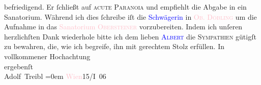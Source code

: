                     befriedigend. Er ſchließt auf \textsc{acute Paranoia} und
                    empfiehlt die Abgabe in ein Sanatorium.\pend
           \pstart
           Während ich dies ſchreibe iſt die \textcolor{blue}{Schwägerin}{} in \textcolor{pink}{\textsc{Ob. Döbling}}{}\ledrightnote{\textcolor{pink}{Oberdöbling}} um die Aufnahme in das \textcolor{pink}{Sanatorium \textsc{Obersteiner}}{}\ledrightnote{\textcolor{pink}{Sanatorium Obersteiner}} vorzubereiten.\pend
           \pstart
           Indem ich unſeren herzlichſten Dank wiederhole {\pb}bitte ich dem lieben \textcolor{blue}{\textsc{Albert}}{}\ledrightnote{\textcolor{blue}{Albert Ehrenstein}} die \textsc{Sympathien} gütigſt zu bewahren, die, wie ich
                    begreife, ihn mit gerechtem Stolz erfüllen.\pend
           \pstart
           In vollkommener Hochachtung{\\[\baselineskip]}ergebenſt{\\[\baselineskip]}\spacefill\mbox{Adolf Treibl}\pend
           \leftskip=0em{}\pstart
           \textcolor{pink}{Wien}{}\ledrightnote{\textcolor{pink}{Wien}}{ }15/I 06\pend
           \endnumbering{}  
      